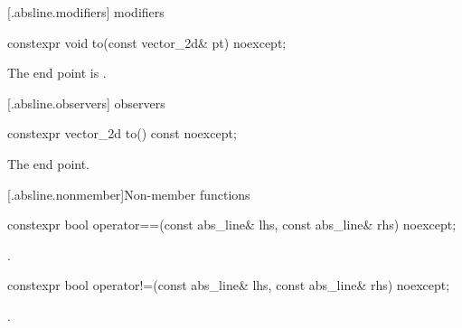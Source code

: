  [\iotwod.absline.modifiers]{ modifiers}%

%
\begin{itemdecl}
constexpr void to(const vector_2d& pt) noexcept;
\end{itemdecl}
\begin{itemdescr}
\pnum
\effects
The end point is .
\end{itemdescr}

 [\iotwod.absline.observers]{ observers}%

%
\begin{itemdecl}
constexpr vector_2d to() const noexcept;
\end{itemdecl}
\begin{itemdescr}
\pnum
\returns
The end point.
\end{itemdescr}

 [\iotwod.absline.nonmember]{Non-member functions}%

%
\begin{itemdecl}
constexpr bool operator==(const abs_line& lhs, const abs_line& rhs) noexcept;
\end{itemdecl}
\begin{itemdescr}
\pnum
\returns
{}.
\end{itemdescr}

%
\begin{itemdecl}
constexpr bool operator!=(const abs_line& lhs, const abs_line& rhs) noexcept;
\end{itemdecl}
\begin{itemdescr}
\pnum
\returns
{}.
\end{itemdescr}
